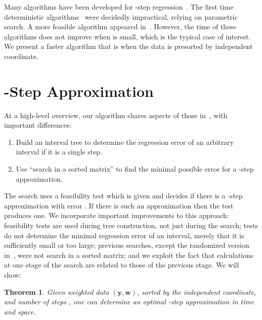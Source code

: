 \documentclass[11pt]{article}
\newtheorem{theorem}{Theorem}
\renewcommand{\vec}[1]{\ensuremath{\mathbf{#1}}}
\newcommand{\data}{\ensuremath{(\vec{y},\vec{w})}}
\begin{document}
Many algorithms have been developed for  -step regression~\cite{ChenWangPiecewise2013,ChenWangnlogn2013,DiazBanezLinearDecide,FournierVigneronLinftyStep,FournierVigneronLinftyParametric,FulopPrillLinftyStep,GuhaShimLinftyHistogram,JQReducedIso_IF2012,KarrasetalHistogramDuality,LiuRandomizedLinftyReduced,MaysterLopezStep}.
The first  time deterministic algorithms~\cite{FournierVigneronLinftyParametric,JQReducedIso_IF2012} were decidedly impractical, relying on parametric search.
A more feasible  algorithm appeared in~\cite{ChenWangnlogn2013}.
However, the time of these algorithms does not improve when  is small, which is the typical case of interest.
We present a faster algorithm that is  when the data is presorted by independent coordinate.


\vspace*{-0.055in}
\section{ -Step Approximation} \label{sec:Linfty}
\vspace*{-0.055in}

At a high-level overview, our algorithm shares aspects of those in~\cite{ChenWangPiecewise2013,FournierVigneronLinftyStep,GuhaShimLinftyHistogram}, with important differences:
\vspace*{-0.05in}
\begin{enumerate}
\item Build an interval tree to determine the regression error of an arbitrary interval if it is a single step.
\vspace*{-0.05in}
\item Use ``search in a sorted matrix'' to find the minimal possible error for a -step approximation.
\end{enumerate}
\vspace*{-0.05in}
The search uses a feasibility test which is given  and decides if there is a -step approximation with error .
If there is such an approximation then the test produces one.
We incorporate important improvements to this approach: feasibility tests are used during tree construction, not just during the search; tests do not determine the minimal regression error of an interval, merely that it is sufficiently small or too large; previous searches, except the randomized version in~\cite{LiuRandomizedLinftyReduced}, were not search in a sorted matrix; and we exploit the fact that calculations at one stage of the search are related to those of the previous stage.
We will show:
\begin{theorem} \label{thm:mainresult}
Given weighted data \data, sorted by the independent coordinate, and number of steps , one can determine an optimal  -step approximation 
in  time and  space.
\end{theorem}
\end{document}
